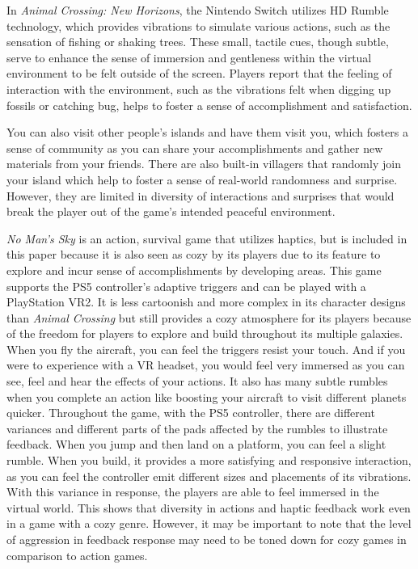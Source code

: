\documentclass[10pt,twocolumn]{article}
\begin{document}
In \textit{Animal Crossing: New Horizons}\cite{animalcrossing2020}, the Nintendo Switch utilizes HD Rumble technology, which provides vibrations to simulate various actions, such as the sensation of fishing or shaking trees. These small, tactile cues, though subtle, serve to enhance the sense of immersion and gentleness within the virtual environment to be felt outside of the screen. Players report that the feeling of interaction with the environment, such as the vibrations felt when digging up fossils or catching bug, helps to foster a sense of accomplishment and satisfaction.

You can also visit other people's islands and have them visit you, which fosters a sense of community as you can share your accomplishments and gather new materials from your friends. There are also built-in villagers that randomly join your island which help to foster a sense of real-world randomness and surprise. However, they are limited in diversity of interactions and surprises that would break the player out of the game's intended peaceful environment.

\textit{No Man's Sky}\cite{nomanssky2016} is an action, survival game that utilizes haptics, but is included in this paper because it is also seen as cozy by its players due to its feature to explore and incur sense of accomplishments by developing areas. This game supports the PS5 controller's adaptive triggers and can be played with a PlayStation VR2. It is less cartoonish and more complex in its character designs than \textit{Animal Crossing}\cite{animalcrossing2020} but still provides a cozy atmosphere for its players because of the freedom for players to explore and build throughout its multiple galaxies. When you fly the aircraft, you can feel the triggers resist your touch. And if you were to experience with a VR headset, you would feel very immersed as you can see, feel and hear the effects of your actions. It also has many subtle rumbles when you complete an action like boosting your aircraft to visit different planets quicker. Throughout the game, with the PS5 controller, there are different variances and different parts of the pads affected by the rumbles to illustrate feedback. When you jump and then land on a platform, you can feel a slight rumble. When you build, it provides a more satisfying and responsive interaction, as you can feel the controller emit different sizes and placements of its vibrations. With this variance in response, the players are able to feel immersed in the virtual world. This shows that diversity in actions and haptic feedback work even in a game with a cozy genre. However, it may be important to note that the level of aggression in feedback response may need to be toned down for cozy games in comparison to action games.
\end{document}
